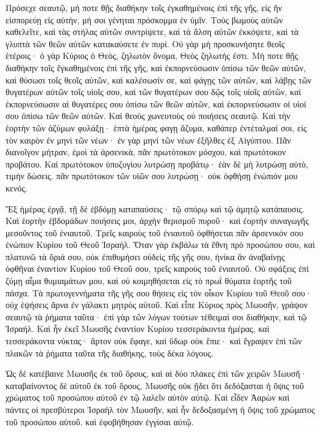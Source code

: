 {Πρόσεχε σεαυτῷ, μή ποτε θῇς διαθήκην τοῖς ἐγκαθημένοις ἐπὶ τῆς γῆς, εἰς ἣν εἰσπορεύῃ εἰς αὐτὴν, μή σοι γένηται πρόσκομμα ἐν ὑμῖν.
Τοὺς βωμοὺς αὐτῶν καθελεῖτε, καὶ τὰς στήλας αὐτῶν συντρίψετε, καὶ τὰ ἄλση αὐτῶν ἐκκόψετε, καὶ τὰ γλυπτὰ τῶν θεῶν αὐτῶν κατακαύσετε ἐν πυρί.
Οὐ γὰρ μὴ προσκυνήσητε θεοῖς ἑτέροις· ὁ γὰρ Κύριος ὁ Θεὸς, ζηλωτὸν ὄνομα, Θεὸς ζηλωτής ἐστι.
Μή ποτε θῇς διαθήκην τοῖς ἔγκαθημένοις ἐπὶ τῆς γῆς, καὶ ἐκπορνεύσωσιν ὀπίσω τῶν θεῶν αὐτῶν, καὶ θύσωσι τοῖς θεοῖς αὐτῶν, καὶ καλέσωσίν σε, καὶ φάγῃς τῶν αὐτῶν,
καὶ λάβῃς τῶν θυγατέρων αὐτῶν τοῖς υἱοῖς σου, καὶ τῶν θυγατέρων σου δῷς τοῖς υἱοῖς αὐτῶν, καὶ ἐκπορνεύσωσιν αἱ θυγατέρες σου ὀπίσω τῶν θεῶν αὐτῶν, καὶ ἐκπορνεύσωσιν οἱ υἱοί σου ὀπίσω τῶν θεῶν αὐτῶν.
Καὶ θεοὺς χωνευτοὺς οὐ ποιήσεις σεαυτῷ.
Καὶ τὴν ἑορτὴν τῶν ἀζύμων φυλάξῃ· ἑπτὰ ἡμέρας φαγῃ ἄζυμα, καθάπερ ἐντέταλμαί σοι, εἰς τὸν καιρὸν ἐν μηνὶ τῶν νέων· ἐν γὰρ μηνὶ τῶν νέων ἐξῆλθες ἐξ Αἰγύπτου.
Πᾶν διανοῖγον μήτραν, ἐμοὶ τὰ ἀρσενικὰ, πᾶν πρωτότοκον μόσχου, καὶ πρωτότοκον προβάτου.
Καὶ πρωτότοκον ὑποζυγίου λυτρώσῃ προβάτῳ· ἐὰν δὲ μὴ λυτρώσῃ αὐτὸ, τιμὴν δώσεις. πᾶν πρωτότοκον τῶν υἱῶν σου λυτρώσῃ· οὐκ ὀφθήσῃ ἐνώπιόν μου κενός.
\par }{\PP {}Ἓξ ἡμέρας ἐργᾷ, τῇ δὲ ἑβδόμῃ καταπαύσεις· τῷ σπόρῳ καὶ τῷ ἀμητῷ κατάπαυσις.
Καὶ ἑορτὴν ἑβδομάδων ποιήσεις μοι, ἀρχὴν θερισμοῦ πυροῦ· καὶ ἐορτὴν συναγωγῆς μεσοῦντος τοῦ ἐνιαυτοῦ.
Τρεῖς καιροὺς τοῦ ἐνιαυτοῦ ὀφθήσεται πᾶν ἀρσενικόν σου ἐνώπιον Κυρίου τοῦ Θεοῦ Ἰσραήλ.
Ὅταν γὰρ ἐκβάλω τὰ ἔθνη πρὸ προσώπου σου, καὶ πλατυνῶ τὰ ὅριά σου, οὐκ ἐπιθυμήσει οὐδεὶς τῆς γῆς σου, ἡνίκα ἂν ἀναβαίνῃς ὀφθῆναι ἐναντίον Κυρίου τοῦ Θεοῦ σου, τρεῖς καιροὺς τοῦ ἐνιαυτοῦ.
Οὐ σφάξεις ἐπὶ ζύμῃ αἷμα θυμιαμάτων μου, καὶ οὐ κοιμηθήσεται εἰς τὸ πρωῒ θύματα ἑορτῆς τοῦ πάσχα.
Τὰ πρωτογεννήματα τῆς γῆς σου θήσεις εἰς τὸν οἶκον Κυρίου τοῦ Θεοῦ σου· οὐχ ἑψήσεις ἄρνα ἐν γάλακτι μητρὸς αὐτοῦ.
Καὶ εἶπε Κύριος πρὸς Μωυσῆν, γράψον σεαυτῷ τὰ ῥήματα ταῦτα· ἐπὶ γὰρ τῶν λόγων τούτων τέθειμαί σοι διαθήκην, καὶ τῷ Ἰσραήλ.
Καὶ ἦν ἐκεῖ Μωυσῆς ἐναντίον Κυρίου τεσσεράκοντα ἡμέρας, καὶ τεσσεράκοντα νύκτας· ἄρτον οὐκ ἔφαγε, καὶ ὕδωρ οὐκ ἔπιε· καὶ ἔγραψεν ἐπὶ τῶν πλακῶν τὰ ῥήματα ταῦτα τῆς διαθήκης, τοὺς δέκα λόγους.
\par }{\PP {}Ὡς δὲ κατέβαινε Μωυσῆς ἐκ τοῦ ὄρους, καὶ αἱ δύο πλάκες ἐπὶ τῶν χειρῶν Μωυσῆ· καταβαίνοντος δὲ αὐτοῦ ἐκ τοῦ ὄρους, Μωυσῆς οὐκ ᾔδει ὅτι δεδόξασται ἡ ὄψις τοῦ χρώματος τοῦ προσώπου αὐτοῦ ἐν τῷ λαλεῖν αὐτὸν αὐτῷ.
Καὶ εἶδεν Ἀαρὼν καὶ πάντες οἱ πρεσβύτεροι Ἰσραὴλ τὸν Μωυσῆν, καὶ ἦν δεδοξασμένη ἡ ὄψις τοῦ χρώματος τοῦ προσώπου αὐτοῦ. καὶ ἐφοβήθησαν ἐγγίσαι αὐτῷ.
}
